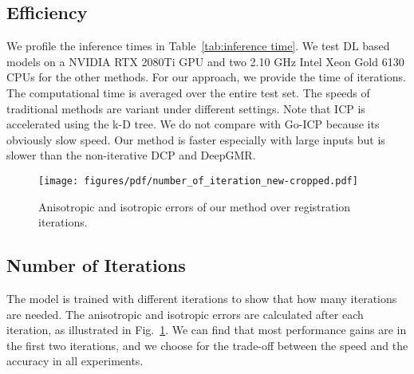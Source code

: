 \documentclass[10pt,twocolumn,letterpaper]{article}
\begin{document}
\subsection{Efficiency}
\label{sec:3.4}
We profile the inference times in Table~\ref{tab:inference time}. We test DL based models on a NVIDIA RTX 2080Ti GPU and two 2.10 GHz Intel Xeon Gold 6130 CPUs for the other methods. For our approach, we provide the time of  iterations. The computational time is averaged over the entire test set. The speeds of traditional methods are variant under different settings. Note that ICP is accelerated using the k-D tree. We do not compare with Go-ICP because its obviously slow speed. Our method is faster especially with large inputs but is slower than the non-iterative DCP and DeepGMR.
\begin{figure}[t]
\centering
\texttt{[image: figures/pdf/number\_of\_iteration\_new-cropped.pdf]}\\
\caption{Anisotropic and isotropic errors of our method over registration iterations.}
\label{fig:number of iteration}
\end{figure} \subsection{Number of Iterations}
\label{sec:3.5}
The model is trained with different iterations to show that how many iterations are needed. The anisotropic and isotropic errors are calculated after each iteration, as illustrated in Fig.~\ref{fig:number of iteration}. We can find that most performance gains are in the first two iterations, and we choose  for the trade-off between the speed and the accuracy in all experiments.
\end{document}
